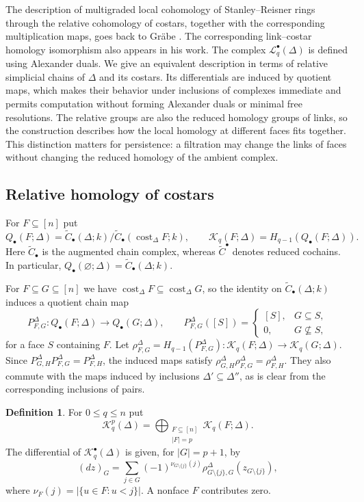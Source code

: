 \documentclass[11pt]{article}
\theoremstyle{plain}
\theoremstyle{definition}
\newtheorem{definition}[theorem]{Definition}
\newcommand{\kk}{k}
\newcommand{\cost}{\operatorname{cost}}
\newcommand{\rC}{\widetilde{C}}
\newcommand{\Lc}{\mathcal L}
\newcommand{\Kc}{\mathcal K}
\begin{document}
The description of multigraded local cohomology of
Stanley--Reisner rings through the relative cohomology
of costars, together with the corresponding multiplication
maps, goes back to Gr\"abe \cite{Grabe1984}.
The corresponding link--costar homology isomorphism
also appears in his work. The complex $\Lc_q^\bullet(\Delta)$ is defined using Alexander duals. We give an equivalent description in terms of relative simplicial chains of $\Delta$ and its costars. Its differentials are induced by quotient maps, which makes their behavior under inclusions of complexes immediate and permits computation without forming Alexander duals or minimal free resolutions. The relative groups are also the reduced homology groups of links, so the construction describes how the local homology at different faces fits together. This distinction matters for persistence: a filtration may change the links of faces without changing the reduced homology of the ambient complex.

\subsection{Relative homology of costars}

For $F\subseteq[n]$ put
\[
Q_\bullet(F;\Delta)=\rC_\bullet(\Delta;\kk)/\rC_\bullet(\cost_\Delta F;\kk),\qquad
\Kc_q(F;\Delta)=H_{q-1}(Q_\bullet(F;\Delta)).
\]
Here $\rC_\bullet$ is the augmented chain complex, whereas $\rC^\bullet$ denotes reduced cochains. In particular, $Q_\bullet(\varnothing;\Delta)=\rC_\bullet(\Delta;\kk)$.

For $F\subseteq G\subseteq[n]$ we have $\cost_\Delta F\subseteq\cost_\Delta G$, so the identity on $\rC_\bullet(\Delta;\kk)$ induces a quotient chain map
\[
P_{F,G}^\Delta:Q_\bullet(F;\Delta)\longrightarrow Q_\bullet(G;\Delta),\qquad
P_{F,G}^\Delta([S])=\begin{cases}[S],&G\subseteq S,\\0,&G\not\subseteq S,\end{cases}
\]
for a face $S$ containing $F$. Let $\rho_{F,G}^\Delta=H_{q-1}(P_{F,G}^\Delta):\Kc_q(F;\Delta)\to\Kc_q(G;\Delta)$. Since $P_{G,H}^\Delta P_{F,G}^\Delta=P_{F,H}^\Delta$, the induced maps satisfy $\rho_{G,H}^\Delta\rho_{F,G}^\Delta=\rho_{F,H}^\Delta$. They also commute with the maps induced by inclusions $\Delta'\subseteq\Delta''$, as is clear from the corresponding inclusions of pairs.

\begin{definition}\label{def:face-link-complex}
For $0\le q\le n$ put
\[
\Kc_q^p(\Delta)=\bigoplus_{\substack{F\subseteq[n]\\|F|=p}}\Kc_q(F;\Delta).
\]
The differential of $\Kc_q^\bullet(\Delta)$ is given, for $|G|=p+1$, by
\[
(dz)_G=\sum_{j\in G}(-1)^{\nu_{G\setminus\{j\}}(j)}
\rho^\Delta_{G\setminus\{j\},G}(z_{G\setminus\{j\}}),
\]
where $\nu_F(j)=|\{u\in F:u<j\}|$. A nonface $F$ contributes zero.
\end{definition}
\end{document}

